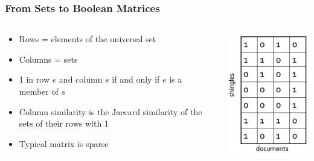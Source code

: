 \documentclass[svgnames]{beamer}
\begin{document}
\begin{frame} \frametitle{From Sets to Boolean Matrices}

 \begin{columns}[T]
    \begin{column}{0.5\textwidth}
\begin{itemize}
\item Rows = elements of the universal set
\item Columns = sets
\item 1 in row $e$ and column $s$ if and only if $e$ is a member of $s$
\item Column similarity is the Jaccard similarity of the sets of their rows with 1
\item Typical matrix is sparse
\end{itemize}
  \end{column}
  \begin{column}{0.5\textwidth}
   \includegraphics[width=5cm]{matrix}
  \end{column}
 \end{columns}
\end{frame}

  
\end{document}

